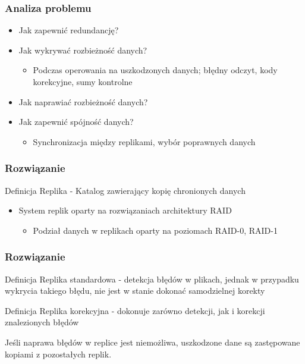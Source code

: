 \documentclass{beamer}
\begin{document}
	\begin{frame}
		\frametitle{Analiza problemu}

		\begin{itemize}
			\item Jak zapewnić redundancję?
		    \pause
            \item Jak wykrywać rozbieżność danych?
			    \begin{itemize}
				    \item Podczas operowania na uszkodzonych danych; błędny odczyt, kody korekcyjne, sumy kontrolne 
			    \end{itemize}
            \item Jak naprawiać rozbieżność danych?
			\pause
            \item Jak zapewnić spójność danych?
            \begin{itemize}
				\item Synchronizacja między replikami, wybór poprawnych danych
			\end{itemize}
		    
		\end{itemize}
	\end{frame}
		
	\begin{frame}
		\frametitle{Rozwiązanie}
			\begin{block}{Definicja}
				Replika - Katalog zawierający kopię chronionych danych
			\end{block}
			\begin{itemize}
				\item System replik oparty na rozwiązaniach architektury RAID
				\begin{itemize}
					\item Podział danych w replikach oparty na poziomach RAID-0, RAID-1
				\end{itemize}
			\end{itemize}
			
	\end{frame}

		
\begin{frame}
	\frametitle{Rozwiązanie}
	\begin{block}{Definicja}
	    Replika standardowa - detekcja błędów w plikach, jednak w przypadku wykrycia takiego błędu, nie jest w stanie dokonać samodzielnej korekty
    \end{block}
	\begin{block}{Definicja}
        Replika korekcyjna - dokonuje zarówno detekcji, jak i korekcji znalezionych błędów
    \end{block}
    Jeśli naprawa błędów w replice jest niemożliwa, uszkodzone dane są zastępowane kopiami z pozostałych replik.
\end{frame}
\end{document}

